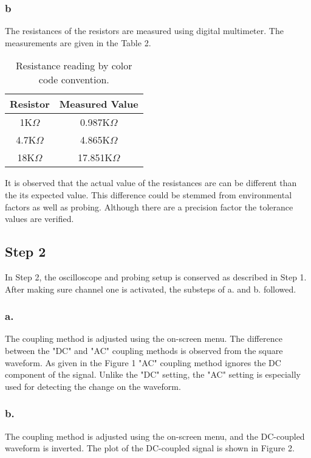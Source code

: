 \documentclass[letterpaper,12pt]{article}
\begin{document}
\subsubsection{b} 
The resistances of the resistors are measured using digital multimeter. The measurements are given in the Table 2. 
\begin{table}[H]
	\begin{center}
		\begin{tabular}{||c | c ||} 
		 \hline
		 Resistor & Measured Value \\ [0.5ex] 
		 \hline\hline
		 1K\( \Omega \) & 0.987K\( \Omega \)  \\ 
		 \hline
	     4.7K\( \Omega \) & 4.865K\( \Omega \)   \\
		 \hline
		 18K\( \Omega \) & 17.851K\( \Omega \)  \\ [1ex] 
		 \hline
		\end{tabular}
	\end{center}
	\caption{Resistance reading by color code convention.}
	\end{table}
	

It is observed that the actual value of the resistances are can be different than the its expected value. This difference could be stemmed from environmental factors as well as probing. Although there are a precision factor the tolerance values are verified.

\subsection{Step 2}
In Step 2, the oscilloscope and probing setup is conserved as described in Step 1. After making sure channel one is activated, the substeps of a. and b. followed.
\subsubsection{a.}
The coupling method is adjusted using the on-screen menu. The difference between the "DC" and "AC" coupling methods is observed from the square waveform. As given in the Figure 1 "AC" coupling method ignores the DC component of the signal. Unlike the "DC" setting, the "AC" setting is especially used for detecting the change on the waveform.


\subsubsection{b.}
The coupling method is adjusted using the on-screen menu, and the DC-coupled waveform is inverted. The plot of the DC-coupled signal is shown in Figure 2.
\end{document}
